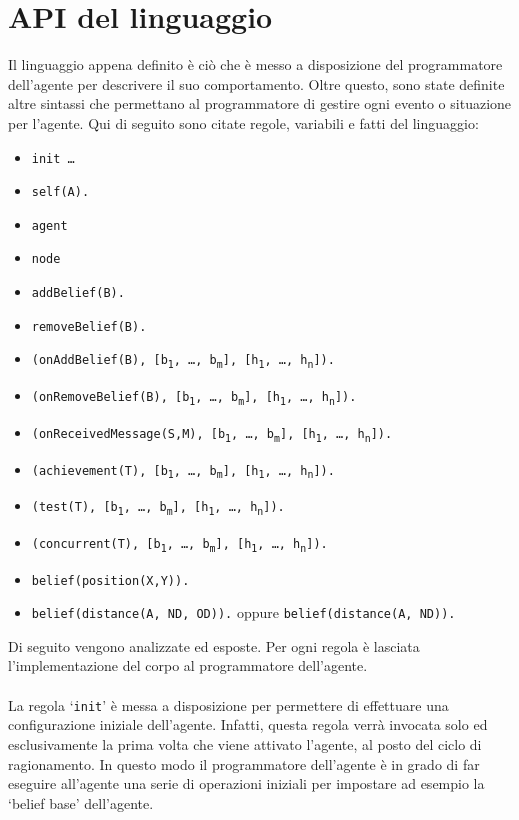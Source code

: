 \section{API del linguaggio}
Il linguaggio appena definito è ciò che è messo a disposizione del programmatore dell'agente per descrivere il suo comportamento. Oltre questo, sono state definite altre sintassi che permettano al programmatore di gestire ogni evento o situazione per l'agente.
Qui di seguito sono citate regole, variabili e fatti del linguaggio:
\begin{itemize}
\item \texttt{init \impliedBy \ldots}
\item \texttt{self(A).}
\item \texttt{agent}
\item \texttt{node}
\item \texttt{addBelief(B).}
\item \texttt{removeBelief(B).}
\item \texttt{\leftArrow(onAddBelief(B), [b\textsubscript{1}, \ldots, b\textsubscript{m}], [h\textsubscript{1}, \ldots, h\textsubscript{n}]).}
\item \texttt{\leftArrow(onRemoveBelief(B), [b\textsubscript{1}, \ldots, b\textsubscript{m}], [h\textsubscript{1}, \ldots, h\textsubscript{n}]).}
\item \texttt{\leftArrow(onReceivedMessage(S,M), [b\textsubscript{1}, \ldots, b\textsubscript{m}], [h\textsubscript{1}, \ldots, h\textsubscript{n}]).}
\item \texttt{\leftArrow(achievement(T), [b\textsubscript{1}, \ldots, b\textsubscript{m}], [h\textsubscript{1}, \ldots, h\textsubscript{n}]).}
\item \texttt{\leftArrow(test(T), [b\textsubscript{1}, \ldots, b\textsubscript{m}], [h\textsubscript{1}, \ldots, h\textsubscript{n}]).}
\item \texttt{\leftArrow(concurrent(T), [b\textsubscript{1}, \ldots, b\textsubscript{m}], [h\textsubscript{1}, \ldots, h\textsubscript{n}]).}
\item \texttt{belief(position(X,Y)).}
\item \texttt{belief(distance(A, ND, OD)).} oppure \texttt{belief(distance(A, ND)).}
\end{itemize}

Di seguito vengono analizzate ed esposte.
Per ogni regola è lasciata l'implementazione del corpo al programmatore dell'agente.

\paragraph*{}
La regola `\texttt{init}' è messa a disposizione per permettere di effettuare una configurazione iniziale dell'agente. Infatti, questa regola verrà invocata solo ed esclusivamente la prima volta che viene attivato l'agente, al posto del ciclo di ragionamento. In questo modo il programmatore dell'agente è in grado di far eseguire all'agente una serie di operazioni iniziali per impostare ad esempio la `belief base' dell'agente.

